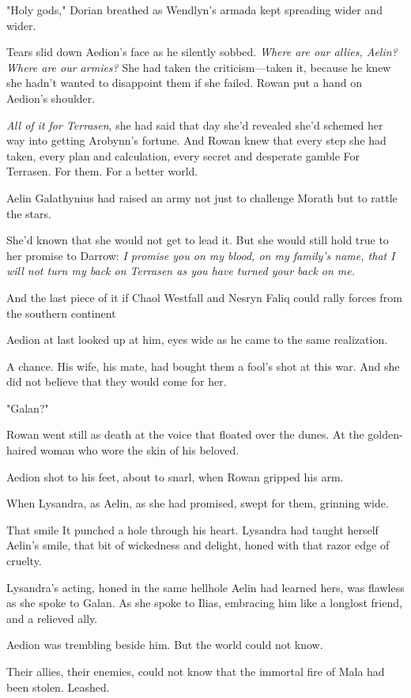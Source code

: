 "Holy gods," Dorian breathed as Wendlyn's armada kept spreading wider and wider.

Tears slid down Aedion's face as he silently sobbed. \emph{Where are our allies, Aelin? Where are our armies?} She had taken the criticism---taken it, because he knew she hadn't wanted to disappoint them if she failed. Rowan put a hand on Aedion's shoulder.

\emph{All of it for Terrasen}, she had said that day she'd revealed she'd schemed her way into getting Arobynn's fortune. And Rowan knew that every step she had taken, every plan and calculation, every secret and desperate gamble  For Terrasen. For them. For a better world.

Aelin Galathynius had raised an army not just to challenge Morath
 but to rattle the stars.

She'd known that she would not get to lead it. But she would still hold true to her promise to Darrow: \emph{I promise you on my blood, on my family's name, that I will not turn my back on Terrasen as you have turned your back on me.}

And the last piece of it  if Chaol Westfall and Nesryn Faliq could rally forces from the southern continent 

Aedion at last looked up at him, eyes wide as he came to the same realization.

A chance. His wife, his mate, had bought them a fool's shot at this war. And she did not believe that they would come for her.

"Galan?"

Rowan went still as death at the voice that floated over the dunes. At the golden-haired woman who wore the skin of his beloved.

Aedion shot to his feet, about to snarl, when Rowan gripped his arm.

When Lysandra, as Aelin, as she had promised, swept for them, grinning wide.

That smile  It punched a hole through his heart. Lysandra had taught herself Aelin's smile, that bit of wickedness and delight, honed with that razor edge of cruelty.

Lysandra's acting, honed in the same hellhole Aelin had learned hers, was flawless as she spoke to Galan. As she spoke to Ilias, embracing him like a longlost friend, and a relieved ally.

Aedion was trembling beside him. But the world could not know.

Their allies, their enemies, could not know that the immortal fire of Mala had been stolen. Leashed.

